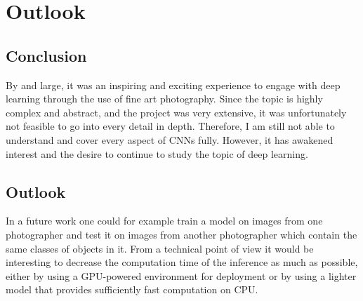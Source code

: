 \chapter{Outlook}
\label{ch:outlook}

\section{Conclusion}

By and large, it was an inspiring and exciting experience to engage with deep learning through the use of fine art photography. Since the topic is highly complex and abstract, and the project was very extensive, it was unfortunately not feasible to go into every detail in depth. Therefore, I am still not able to understand and cover every aspect of CNNs fully. However, it has awakened interest and the desire to continue to study the topic of deep learning.

\section{Outlook}

In a future work one could for example train a model on images from one photographer and test it on images from another photographer which contain the same classes of objects in it. From a technical point of view it would be interesting to decrease the computation time of the inference as much as possible, either by using a GPU-powered environment for deployment or by using a lighter model that provides sufficiently fast computation on CPU.